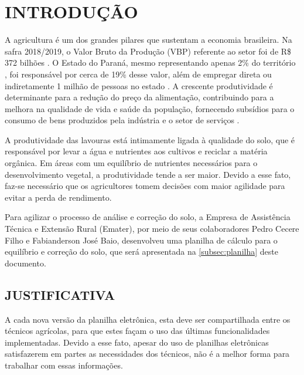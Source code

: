 
\chapter{INTRODUÇÃO}
\label{chap:introducao}

A agricultura é um dos grandes pilares que sustentam a economia brasileira. Na safra 2018/2019, o Valor Bruto da Produção (VBP) referente ao setor foi de R\$ 372 bilhões \cite{minagri2019}. O Estado do Paraná, mesmo representando apenas 2\% do território \cite{ibge2018}, foi responsável por cerca de 19\% desse valor, além de empregar direta ou indiretamente 1 milhão de pessoas no estado \cite{emater2016}. A crescente produtividade é determinante para a redução do preço da alimentação, contribuindo para a melhora na qualidade de vida e saúde da população, fornecendo subsídios para o consumo de bens produzidos pela indústria e o setor de serviços \cite{cna2018}.

A produtividade das lavouras está intimamente ligada à qualidade do solo, que é responsável por levar a água e nutrientes aos cultivos e reciclar a matéria orgânica. Em áreas com um equilíbrio de nutrientes necessários para o desenvolvimento vegetal, a produtividade tende a ser maior. Devido a esse fato, faz-se necessário que os agricultores tomem decisões com maior agilidade para evitar a perda de rendimento.

Para agilizar o processo de análise e correção do solo, a Empresa de Assistência Técnica e Extensão Rural (Emater), por meio de seus colaboradores Pedro Cecere Filho e Fabianderson José Baio, desenvolveu uma planilha de cálculo para o equilíbrio e correção do solo, que será apresentada na \autoref{subsec:planilha} deste documento.

\section{JUSTIFICATIVA}
\label{sec:justificativa}

A cada nova versão da planilha eletrônica, esta deve ser compartilhada entre os técnicos agrícolas, para que estes façam o uso das últimas funcionalidades implementadas. Devido a esse fato, apesar do uso de planilhas eletrônicas satisfazerem em partes as necessidades dos técnicos, não é a melhor forma para trabalhar com essas informações.


